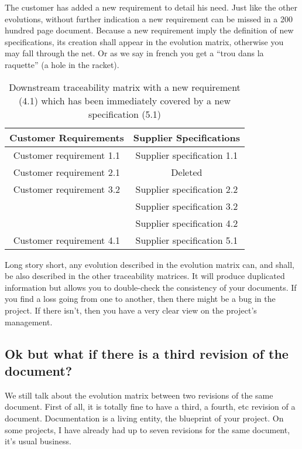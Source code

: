 The customer has added a new requirement to detail his need. Just like the other evolutions, without further indication a new requirement can be missed in a 200 hundred page document. Because a new requirement imply the definition of new specifications, its creation shall appear in the evolution matrix, otherwise you may fall through the net. Or as we say in french you get a “trou dans la raquette” (a hole in the racket).

\begin{table*}
	\centering
		\begin{tabular}{|c|c|}
			\hline
			\textbf{Customer Requirements} & \textbf{Supplier Specifications}\\
            \hline
            Customer requirement 1.1 & Supplier specification 1.1\\
            \hline
            Customer requirement 2.1 & Deleted\\
            \hline
            Customer requirement 3.2 & Supplier specification 2.2\\
            &Supplier specification 3.2\\
            &Supplier specification 4.2\\
            \hline
            Customer requirement 4.1 & Supplier specification 5.1\\
            \hline
		\end{tabular}
	\caption{Downstream traceability matrix with a new requirement (4.1) which has been immediately covered by a new specification (5.1)}
	\label{tab:DownstreamTraceabilityMatrixWithNewReq}
\end{table*}

Long story short, any evolution described in the evolution matrix can, and shall, be also described in the other traceability matrices. It will produce duplicated information but allows you to double-check the consistency of your documents. If you find a loss going from one to another, then there might be a bug in the project. If there isn’t, then you have a very clear view on the project’s management.

\subsection{Ok but what if there is a third revision of the document?}
We still talk about the evolution matrix between two revisions of the same document. First of all, it is totally fine to have a third, a fourth, etc revision of a document. Documentation is a living entity, the blueprint of your project. On some projects, I have already had up to seven revisions for the same document, it’s usual business.

